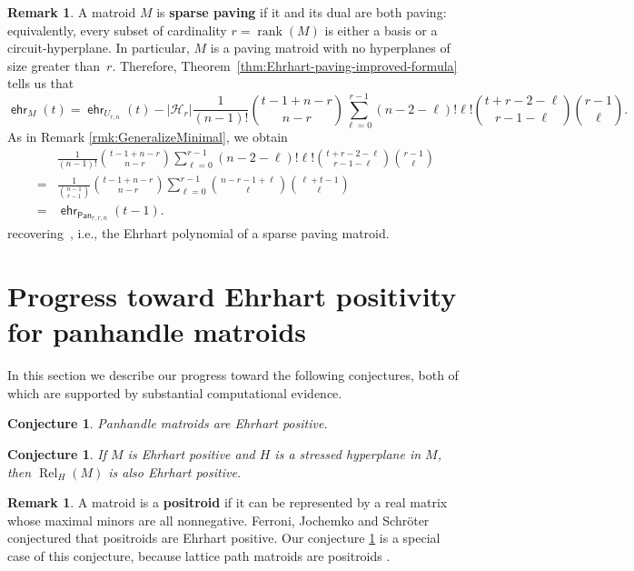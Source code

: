 \documentclass[11pt]{amsart}
\newtheorem{conjecture}[theorem]{Conjecture}
\theoremstyle{definition}
\newtheorem{remark}[theorem]{Remark}
\newcommand{\0}{\emptyset}
\DeclareMathOperator{\ehr}{\mathsf{ehr}}
\DeclareMathOperator{\Rel}{Rel} %
\newcommand{\defterm}[1]{\textbf{#1}}
\DeclareMathOperator{\Pan}{\mathsf{Pan}} %
\DeclareMathOperator{\rank}{\operatorname{rank}}
\newcommand{\HH}{\mathcal{H}}
\newcommand{\JLM}[1]{\par \noindent
  \framebox{\begin{minipage}[c]{0.95 \textwidth}\color{blue} Jeremy Note:
      #1 \end{minipage}\color{blue}}\par}
\newcommand{\DM}[1]{\par \noindent
  \framebox{\begin{minipage}[c]{0.95 \textwidth}\color{ForestGreen} Daniel Note:
      #1 \end{minipage}\color{ForestGreen}}\par}
\begin{document}
\begin{remark} \label{rmk:sparse}
A matroid $M$ is \defterm{sparse paving} if it and its dual are both paving: equivalently, every subset of cardinality $r=\rank(M)$ is either a basis or a circuit-hyperplane.
In particular, $M$ is a paving matroid with no hyperplanes of size greater than~$r$.
Therefore, Theorem~\ref{thm:Ehrhart-paving-improved-formula} tells us that
\[
\ehr_{M}(t)=\ehr_{U_{r,n}}(t)-|\HH_r|\frac{1}{(n-1)!}\binom{t-1+n-r}{n-r}\sum_{\ell=0}^{r-1}(n-2-\ell)!\ell!\binom{t+r-2-\ell}{r-1-\ell}\binom{r-1}{\ell}.
\]
As in Remark \ref{rmk:GeneralizeMinimal}, we obtain
\begin{align*}
&\frac{1}{(n-1)!}\binom{t-1+n-r}{n-r}\sum_{\ell=0}^{r-1}(n-2-\ell)!\ell!\binom{t+r-2-\ell}{r-1-\ell}\binom{r-1}{\ell}\\
=&\frac{1}{\binom{n-1}{r-1}}\binom{t-1+n-r}{n-r}\sum_{\ell=0}^{r-1}\binom{n-r-1+\ell}{\ell}\binom{\ell+t-1}{\ell}\\
=&\ehr_{\Pan_{r,r,n}}(t-1).
\end{align*}
recovering~\cite[Corollary~4.6]{FerroniNotPositive}, i.e., the Ehrhart polynomial of a sparse paving matroid.
\end{remark}




\section{Progress toward Ehrhart positivity for panhandle matroids} \label{sec:ehrhart-panhandle}

In this section we describe our progress toward the following conjectures, both of which are supported by substantial computational evidence.

\begin{conjecture} \label{PanhandlePositive}
Panhandle matroids are Ehrhart positive.
\end{conjecture}

\begin{conjecture} \label{RelaxationPositive}
If $M$ is Ehrhart positive and $H$ is a stressed hyperplane in $M$, then $\Rel_H(M)$ is also Ehrhart positive.
\end{conjecture}

\begin{remark}
A matroid is a \defterm{positroid} \cite{KLS} if it can be represented by a real matrix whose maximal minors are all nonnegative.
Ferroni, Jochemko and Schr\"oter \cite{FerroniJochemkSchroter} conjectured that positroids are Ehrhart positive.
Our conjecture \ref{PanhandlePositive} is a special case of this conjecture, because lattice path matroids are positroids \cite[Lemma~23]{OhPositroids}.
\end{remark}
\end{document}
